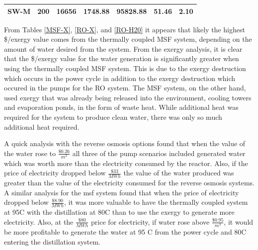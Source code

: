 \documentclass[12pt]{UIdahoMastersThesis}
\begin{document}
\begin{table}[h!]
\begin{tabular}{|l|l|l|l|l|l|l|}
SW-M                                                                                  & 200                                                                                     & 16656                                                                                          & 1748.88                                                                            & 95828.88                                                                            & 51.46              & 2.10                                                               \\ \hline
\end{tabular}
\end{table}

From Tables \ref{MSF-X}, \ref{RO-X}, and \ref{RO-H20} it appears that likely the highest \$/exergy value comes from the thermally coupled MSF system, depending on the amount of water desired from the system. From the exergy analysis, it is clear that the \$/exergy value for the water generation is significantly greater when using the thermally coupled MSF system.  This is due to the exergy destruction which occurs in the power cycle in addition to the exergy destruction which occured in the pumps for the RO system.  The MSF system, on the other hand, used exergy that was already being released into the environment, cooling towers and evaporation ponds, in the form of waste heat.  While additional heat was required for the system to produce clean water, there was only so much additional heat required. 

	A quick analysis with the reverse osmosis options found that when the value of the water rose to $\frac{\$0.26}{m^3}$  all three of the pump scenarios included generated water which was worth more than the electricity consumed by the reactor.  Also, if the price of electricity dropped below $\frac{\$33}{MWh}$ the value of the water produced was greater than the value of the electricity consumed for the reverse osmosis systems. A similar analysis for the \ac{msf} system found that when the price of electricity dropped below $\frac{\$8.90}{MWh}$, it was more valuable to have the thermally coupled system at 95\degree C with the distillation at 80\degree C than to use the exergy to generate more electricity. Also, at the $\frac{\$80}{MWh}$ price for electricity, if water rose above $\frac{\$0.95}{m^3}$, it would be more profitable to generate the water at 95 \degree C from the power cycle and 80\degree C entering the distillation system.
    
\end{document}
